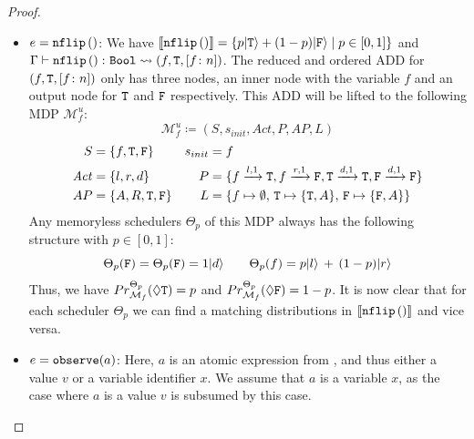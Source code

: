 \begin{proof}
\begin{itemize}
		
		\item $e =\texttt{nflip}\left(\right) $: We have $\llbracket \texttt{nflip}\left(\right)  \rrbracket = \{p|\texttt{T}\rangle + (1-p)|\texttt{F}\rangle \;|\; p\in [0,1]\}$ and $\Gamma \vdash \texttt{nflip}\left(\right)  \colon \texttt{Bool} \leadsto (f, \texttt{T}, [f\colon n])$. 
		The reduced and ordered ADD for $(f, \texttt{T}, [f\colon n])$ only has three nodes, an inner node with the variable $f$ and an output node for $\texttt{T}$ and $\texttt{F}$ respectively. This ADD will be lifted to the following MDP $\mathcal{M}^u_f$:
		$$\mathcal{M}^u_f \coloneqq (S, s_{init}, \mathit{Act}, P, AP, L)$$
		\begin{align*}
			S &=  \{f, \texttt{T}, \texttt{F}\} & s_{init} &= f \\
			\mathit{Act} &= \{l,r,d\} & P &= \{f\xrightarrow{l,1}\texttt{T}, f\xrightarrow{r,1}\texttt{F}, \texttt{T}\xrightarrow{d,1}\texttt{T}, \texttt{F} \xrightarrow{d,1}\texttt{F}\} \\
			AP &= \{A,R, \texttt{T}, \texttt{F}\} & L &= \{f \mapsto \emptyset,\, \texttt{T} \mapsto \{\texttt{T}, A\},\, \texttt{F} \mapsto \{\texttt{F}, A\}\}
		\end{align*}
		Any memoryless schedulers $\Theta_p$ of this MDP always has the following structure with $p\in [0,1]$:
		$$ \Theta_p(\texttt{F}) = \Theta_p(\texttt{F}) = 1|d\rangle \qquad \Theta_p(f) = p|l\rangle \, + \, (1-p)|r\rangle $$
		Thus, we have $Pr^{\Theta_p}_{\mathcal{M}_f}(\lozenge \texttt{T}) = p$ and $Pr^{\Theta_p}_{\mathcal{M}_f}(\lozenge \texttt{F}) = 1-p$.
		It is now clear that for each scheduler $\Theta_p$ we can find a matching distributions in $\llbracket \texttt{nflip}\left(\right)  \rrbracket$ and vice versa.\\
		
		
		\item $e = \textnormal{\texttt{observe}} (a)$: Here, $a$ is an atomic expression from \AEXP, and thus either a value $v$ or a variable identifier $x$. 
		We assume that $a$ is a variable $x$, as the case where $a$ is a value $v$ is subsumed by this case. 
		

\end{itemize}
\end{proof}
